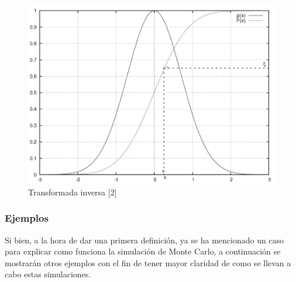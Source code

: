 \begin{itemize}
    \begin{center}
        \begin{figure}[H]
            \begin{center}
                \includegraphics[scale=0.42]{images/trans-inver.PNG}
                \caption{Transformada inversa [2]}
                \label{fig:my_label}
            \end{center}
        \end{figure}
    \end{center}
    
\end{itemize}

\subsubsection{Ejemplos} %
\noindent Si bien, a la hora de dar una primera definición, ya se ha mencionado un caso para explicar como funciona la simulación de Monte Carlo, a continuación se mostrarán otros ejemplos con el fin de tener mayor claridad de como se llevan a cabo estas simulaciones.

